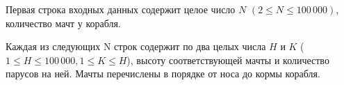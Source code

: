 Первая строка входных данных содержит целое число $N$ $(2 \le N \le 100\,000)$, количество мачт у корабля.

Каждая из следующих N строк содержит по два целых числа $H$ и $K$ ($1 \le H \le 100\,000, 1 \le K \le H$), высоту
соответствующей мачты и количество парусов на ней. Мачты перечислены в порядке от носа до кормы
корабля. 